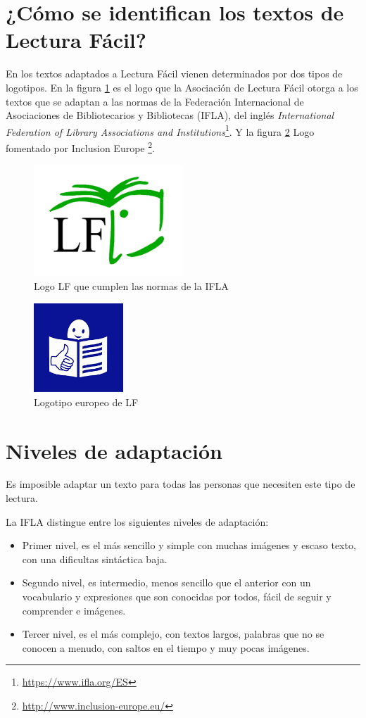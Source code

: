 \section{¿Cómo se identifican los textos de Lectura Fácil?}
En los textos adaptados a Lectura Fácil vienen determinados por dos tipos de logotipos. En la figura \ref{fig:IFLA} es el logo que la Asociación de Lectura Fácil otorga a los textos que se adaptan a las normas de la Federación Internacional de Asociaciones de Bibliotecarios y Bibliotecas (IFLA), del inglés \textit{International Federation of Library Associations and Institutions}\footnote{\href{https://www.ifla.org/ES}{https://www.ifla.org/ES}}. Y la figura  \ref{fig:logoEuropeo}
Logo fomentado por Inclusion Europe \footnote{\href{http://www.inclusion-europe.eu/}{http://www.inclusion-europe.eu/}}.
\begin{figure}[htb]
\centering
	\includegraphics[width=0.5\textwidth]{Imagenes/Logos/indice}
	\caption{Logo LF que cumplen las normas de la IFLA}
	\label{fig:IFLA}
\end{figure} 
\begin{figure}[htb]
	\centering
	\includegraphics[width=0.3\textwidth]{Imagenes/Logos/indice2}
	\caption{Logotipo europeo de LF}
	\label{fig:logoEuropeo}
\end{figure} 
\section{Niveles de adaptación}
Es imposible adaptar un texto para todas las personas que necesiten este tipo de lectura.
 
La IFLA distingue entre los siguientes niveles de adaptación:
\begin{itemize}
	\item Primer nivel, es el más sencillo y simple con muchas imágenes y escaso texto, con una dificultas sintáctica baja.
\item Segundo nivel, es intermedio, menos sencillo que el anterior con un vocabulario y expresiones que son conocidas por todos, fácil de seguir y comprender e imágenes.
\item Tercer nivel, es el más complejo, con textos largos, palabras que no se conocen a menudo, con saltos en el tiempo y muy pocas imágenes. 
 \end{itemize}
